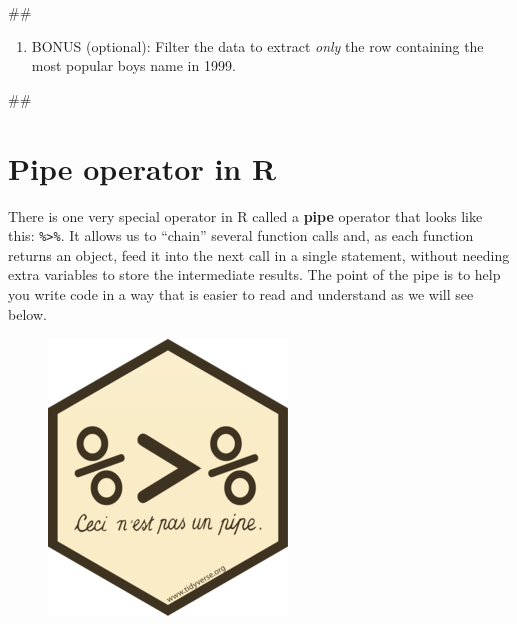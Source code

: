 \documentclass[]{book}
\newenvironment{Shaded}{\begin{snugshade}}{\end{snugshade}}
\newcommand{\NormalTok}[1]{#1}
\providecommand{\tightlist}{%
  \setlength{\itemsep}{0pt}\setlength{\parskip}{0pt}}
\begin{document}
\begin{Shaded}
\begin{Highlighting}[]
\NormalTok{##}
\end{Highlighting}
\end{Shaded}

\begin{enumerate}
\def\labelenumi{\arabic{enumi}.}
\setcounter{enumi}{2}
\tightlist
\item
  BONUS (optional): Filter the data to extract \emph{only} the row
  containing the most popular boys name in 1999.
\end{enumerate}

\begin{Shaded}
\begin{Highlighting}[]
\NormalTok{##}
\end{Highlighting}
\end{Shaded}

\section{Pipe operator in R}\label{pipe-operator-in-r}

There is one very special operator in R called a \textbf{pipe} operator
that looks like this: \texttt{\%\textgreater{}\%}. It allows us to
``chain'' several function calls and, as each function returns an
object, feed it into the next call in a single statement, without
needing extra variables to store the intermediate results. The point of
the pipe is to help you write code in a way that is easier to read and
understand as we will see below.

\begin{figure}
\centering
\includegraphics{R/Rintro/images/magrittr.png}
\caption{}
\end{figure}
\end{document}
